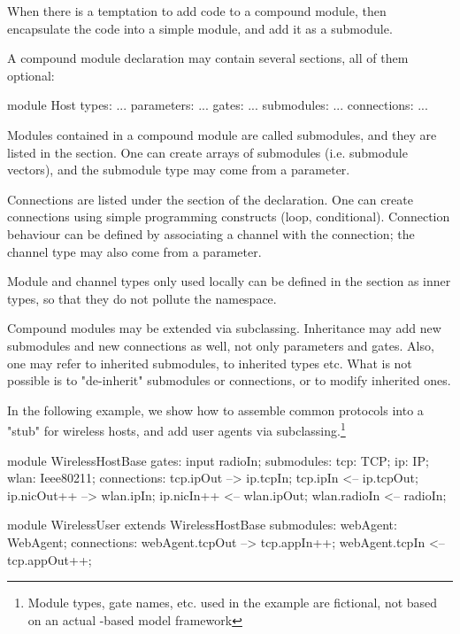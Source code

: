 \begin{note}
    When there is a temptation to add code to a compound module,
    then encapsulate the code into a simple module, and add it as
    a submodule.
\end{note}

A compound module declaration may contain several sections,
all of them optional:

\begin{ned}
module Host
{
   types:
       ...
   parameters:
       ...
   gates:
       ...
   submodules:
       ...
   connections:
       ...
}
\end{ned}

Modules contained in a compound module are called submodules, and they are
listed in the  section. One can create arrays of submodules
(i.e. submodule vectors), and the submodule type may come from a parameter.

Connections are listed under the  section of the
declaration. One can create connections using simple programming constructs
(loop, conditional). Connection behaviour can be defined by associating a
channel with the connection; the channel type may also come from a
parameter.

Module and channel types only used locally can be defined in the
 section as inner types, so that they do not pollute the
namespace.

Compound modules may be extended via subclassing. Inheritance may add new
submodules and new connections as well, not only parameters and gates.
Also, one may refer to inherited submodules, to inherited types etc. What
is not possible is to "de-inherit" submodules or connections, or to modify
inherited ones.

In the following example, we show how to assemble common protocols
into a "stub" for wireless hosts, and add user agents via
subclassing.\footnote{Module types, gate names, etc. used in the example
are fictional, not based on an actual {\opp}-based model framework}

\begin{ned}
module WirelessHostBase
{
   gates:
       input radioIn;
   submodules:
       tcp: TCP;
       ip: IP;
       wlan: Ieee80211;
   connections:
       tcp.ipOut --> ip.tcpIn;
       tcp.ipIn <-- ip.tcpOut;
       ip.nicOut++ --> wlan.ipIn;
       ip.nicIn++ <-- wlan.ipOut;
       wlan.radioIn <-- radioIn;
}

module WirelessUser extends WirelessHostBase
{
   submodules:
       webAgent: WebAgent;
   connections:
       webAgent.tcpOut --> tcp.appIn++;
       webAgent.tcpIn <-- tcp.appOut++;
}
\end{ned}

